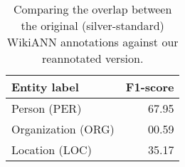 \documentclass[../report.tex]{subfiles}
\begin{document}
\begin{table}[t]
\centering
{
\begin{tabular}{@{}lr@{}}
\toprule
Entity label       & F1-score  \\ \midrule
Person (PER)       & 67.95     \\ 
Organization (ORG) & 00.59     \\ 
Location (LOC)     & 35.17     \\
\bottomrule
\end{tabular}

}
\caption{
    Comparing the overlap between the original (silver-standard) WikiANN annotations against our reannotated version.
}
\label{table:results_gold}
\end{table}
\end{document}
